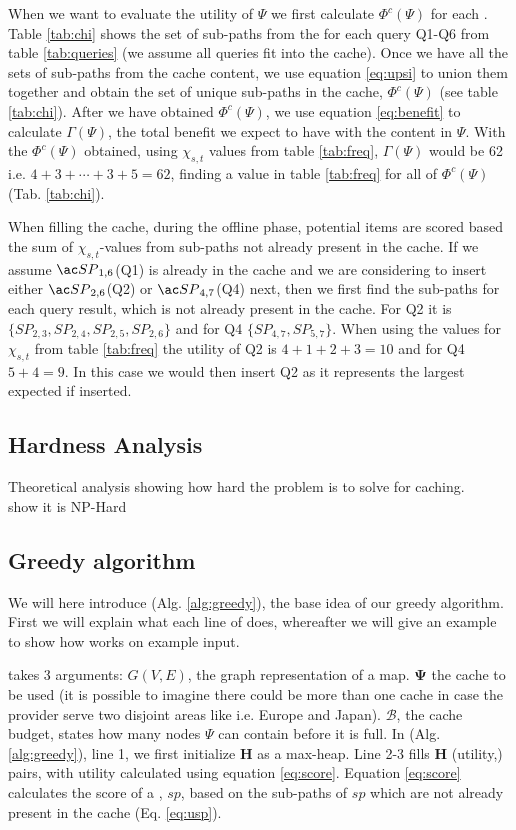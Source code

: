 When we want to evaluate the utility of $\Psi$ we first calculate $\Phi^c(\Psi)$ for each \spath. Table \ref{tab:chi} shows the set of sub-paths from the \spaths for each query Q1-Q6 from table \ref{tab:queries} (we assume all queries fit into the cache). Once we have all the sets of sub-paths from the cache content, we use equation \ref{eq:upsi} to union them together and obtain the set of unique sub-paths in the cache, $\Phi^c(\Psi)$ (see table \ref{tab:chi}). After we have obtained $\Phi^c(\Psi)$, we use equation \ref{eq:benefit} to calculate $\Gamma(\Psi)$, the total benefit we expect to have with the content in $\Psi$. With the $\Phi^c(\Psi)$ obtained, using $\chi_{s,t}$ values from table \ref{tab:freq}, $\Gamma(\Psi)$ would be 62 i.e. $4+3+\dotsb+3+5 = 62$, finding a value in table \ref{tab:freq} for all \spaths of $\Phi^c(\Psi)$ (Tab. \ref{tab:chi}).

When filling the cache, during the offline phase, potential \spath items are scored based the sum of $\chi_{s,t}$-values from sub-paths not already present in the cache. If we assume $\spath_{1,6}$(Q1) is already in the cache and we are considering to insert either $\spath_{2,6}$(Q2) or $\spath_{4,7}$(Q4) next, then we first find the sub-paths for each query result, which is not already present in the cache. For Q2 it is $\{SP_{2,3},SP_{2,4},SP_{2,5},SP_{2,6}\}$ and for Q4 $\{SP_{4,7},SP_{5,7}\}$. When using the values for $\chi_{s,t}$ from table \ref{tab:freq} the utility of Q2 is $4+1+2+3=10$ and for Q4 $5+4=9$. In this case we would then insert Q2 as it represents the largest expected if inserted.

\subsection{Hardness Analysis}
Theoretical analysis showing how hard the problem is to solve for \spath caching.\\
show it is NP-Hard
 

\subsection{Greedy algorithm}
We will here introduce \salgo (Alg. \ref{alg:greedy}), the base idea of our greedy algorithm. First we will explain what each line of \salgo does, whereafter we will give an example to show how \salgo works on example input.

\salgo takes 3 arguments: $G(V,E)$, the graph representation of a map. $\mathbf{\Psi}$ the cache to be used (it is possible to imagine there could be more than one cache in case the \spath provider serve two disjoint areas like i.e. Europe and Japan). $\mathcal{B}$, the cache budget, states how many nodes $\Psi$ can contain before it is full.
In \salgo (Alg. \ref{alg:greedy}), line 1, we first initialize \textbf{H} as a max-heap. Line 2-3 fills \textbf{H} (utility,\spath) pairs, with utility calculated using equation \ref{eq:score}. 
Equation \ref{eq:score} calculates the score of a \spathns, $sp$, based on the sub-paths of $sp$ which are not already present in the cache (Eq. \ref{eq:usp}).

